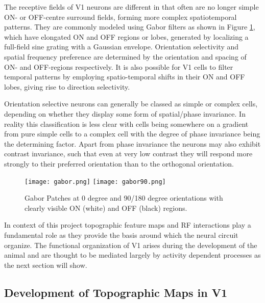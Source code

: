 The receptive fields of V1 neurons are different in that often are no
longer simple ON- or OFF-centre surround fields, forming more complex
spatiotemporal patterns. They are commonly modeled using Gabor filters
as shown in Figure \ref{Gabor}, which have elongated ON and OFF
regions or lobes, generated by localizing a full-field sine grating
with a Gaussian envelope. Orientation selectivity and spatial
frequency preference are determined by the orientation and spacing of
ON- and OFF-regions respectively. It is also possible for V1 cells to
filter temporal patterns by employing spatio-temporal shifts in their
ON and OFF lobes, giving rise to direction selectivity.

Orientation selective neurons can generally be classed as simple or
complex cells, depending on whether they display some form of
spatial/phase invariance. In reality this classification is less clear
with cells being somewhere on a gradient from pure simple cells to a
complex cell with the degree of phase invariance being the determining
factor. Apart from phase invariance the neurons may also exhibit
contrast invariance, such that even at very low contrast they will
respond more strongly to their preferred orientation than to the
orthogonal orientation.

\begin{figure}
	\centering \texttt{[image: gabor.png]}
        \texttt{[image: gabor90.png]}
	\caption{Gabor Patches at 0 degree and 90/180 degree
          orientations with clearly visible ON (white) and OFF (black)
          regions.}
	\label{Gabor}
\end{figure}

In context of this project topographic feature maps and RF
interactions play a fundamental role as they provide the basis around
which the neural circuit organize. The functional organization of V1
arises during the development of the animal and are thought to be
mediated largely by activity dependent processes as the next section
will show.

\subsection{Development of Topographic Maps in V1}

